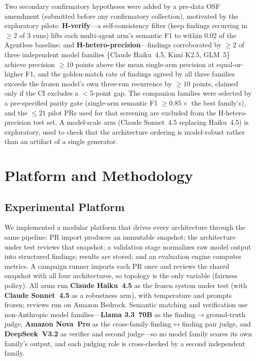 \documentclass[conference]{IEEEtran}
\begin{document}
Two secondary confirmatory hypotheses were added by a pre-data OSF
amendment (submitted before any confirmatory collection), motivated by the
exploratory pilots: \textbf{H-verify}---a self-consistency filter (keep
findings recurring in ${\geq}2$ of 3 runs) lifts each multi-agent arm's
semantic F1 to within 0.02 of the Agentless baseline; and
\textbf{H-hetero-precision}---findings corroborated by ${\geq}2$ of three
independent model families \{Claude Haiku~4.5, Kimi K2.5, GLM~5\} achieve
precision ${\geq}10$ points above the mean single-arm precision at
equal-or-higher F1, and the golden-match rate of findings agreed by all
three families exceeds the frozen model's own three-run recurrence by
${\geq}10$ points, claimed only if the CI excludes a ${<}5$-point gap. The
companion families were selected by a pre-specified parity gate (single-arm
semantic F1 ${\geq}0.85\times$ the best family's), and the ${\leq}21$ pilot
PRs used for that screening are excluded from the H-hetero-precision test
set. A model-scale arm (Claude Sonnet~4.5 replacing Haiku~4.5) is
exploratory, used to check that the architecture ordering is model-robust
rather than an artifact of a single generator.

\section{Platform and Methodology}

\subsection{Experimental Platform}
We implemented a modular platform that drives every architecture through the
same pipeline: PR import produces an immutable snapshot; the architecture
under test reviews that snapshot; a validation stage normalizes raw model
output into structured findings; results are stored; and an evaluation
engine computes metrics. A campaign runner imports each PR once and reviews
the shared snapshot with all four architectures, so topology is the only
variable (fairness policy). All arms run \textbf{Claude Haiku~4.5} as the
frozen system under test (with \textbf{Claude Sonnet~4.5} as a robustness
arm), with temperature and prompts frozen; reviews run on Amazon Bedrock.
Semantic matching and verification use non-Anthropic model
families---\textbf{Llama 3.3~70B} as the finding$\to$ground-truth judge,
\textbf{Amazon Nova~Pro} as the cross-family finding$\leftrightarrow$finding
pair judge, and \textbf{DeepSeek~V3.2} as verifier and second judge---so no
model family scores its own family's output, and each judging role is
cross-checked by a second independent family.
\end{document}
